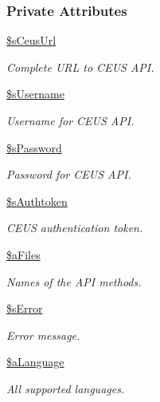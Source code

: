 \subsubsection*{Private Attributes}
\begin{DoxyCompactItemize}
\item 
\hyperlink{classceus__importer_a088b85eaa1fbe9e6fe82405cf865be87}{\$s\+Ceus\+Url}
\begin{DoxyCompactList}\small\item\em Complete U\+R\+L to C\+E\+U\+S A\+P\+I. \end{DoxyCompactList}\item 
\hyperlink{classceus__importer_a6a8bb67b9b483c3389abcd78c451ff57}{\$s\+Username}
\begin{DoxyCompactList}\small\item\em Username for C\+E\+U\+S A\+P\+I. \end{DoxyCompactList}\item 
\hyperlink{classceus__importer_aa0e0dca3ea68cd00d0e474f28887afdd}{\$s\+Password}
\begin{DoxyCompactList}\small\item\em Password for C\+E\+U\+S A\+P\+I. \end{DoxyCompactList}\item 
\hyperlink{classceus__importer_a0cd601a9ac27d96f9cdd6df63b16cdbf}{\$s\+Authtoken}
\begin{DoxyCompactList}\small\item\em C\+E\+U\+S authentication token. \end{DoxyCompactList}\item 
\hyperlink{classceus__importer_ad7deba772fa82f6de2343032ac86a5b5}{\$a\+Files}
\begin{DoxyCompactList}\small\item\em Names of the A\+P\+I methods. \end{DoxyCompactList}\item 
\hyperlink{classceus__importer_a92ce9963d72f9742e6e7051b23c478b6}{\$s\+Error}
\begin{DoxyCompactList}\small\item\em Error message. \end{DoxyCompactList}\item 
\hyperlink{classceus__importer_a87139169928b8a390915f5962c56f814}{\$a\+Language}
\begin{DoxyCompactList}\small\item\em All supported languages. \end{DoxyCompactList}\item 

\end{DoxyCompactItemize}
